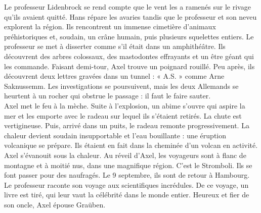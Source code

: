 \documentclass[12pt,a4paper]{article}
\begin{document}
{Le professeur Lidenbrock se rend compte que le vent les a ramenés sur le rivage qu’ils avaient quitté. 
Hans répare les avaries tandis que le professeur et son neveu explorent la région. 
Ils rencontrent un immense cimetière d’animaux préhistoriques et, soudain, un crâne humain, puis plusieurs squelettes entiers. 
Le professeur se met à disserter comme s’il était dans un amphithéâtre.
Ils découvrent des arbres colossaux, des mastodontes effrayants et un être géant qui les commande. 
Faisant demi-tour, Axel trouve un poignard rouillé. 
Peu après, ils découvrent deux lettres gravées dans un tunnel : «   A.S.  » comme Arne Saknussemm. 
Les investigations se poursuivent, mais les deux Allemands se heurtent à un rocher qui obstrue le passage : il faut le faire sauter.\\

Axel met le feu à la mèche. 
Suite à l’explosion, un abime s’ouvre qui aspire la mer et les emporte avec le radeau sur lequel ils s’étaient retirés. 
La chute est vertigineuse. 
Puis, arrivé dans un puits, le radeau remonte progressivement. 
La chaleur devient soudain insupportable et l’eau bouillante : une éruption volcanique se prépare. 
Ils étaient en fait dans la cheminée d’un volcan en activité. 
Axel s’évanouit sous la chaleur.
Au réveil d’Axel, les voyageurs sont à flanc de montagne et à moitié nus, dans une magnifique région. 
C’est le Stromboli. Ils se font passer pour des naufragés.
Le 9 septembre, ils sont de retour à Hambourg. 
Le professeur raconte son voyage aux scientifiques incrédules. 
De ce voyage, un livre est tiré, qui leur vaut la célébrité dans le monde entier. 
Heureux et fier de son oncle, Axel épouse Graüben.\\
}
\end{document}
